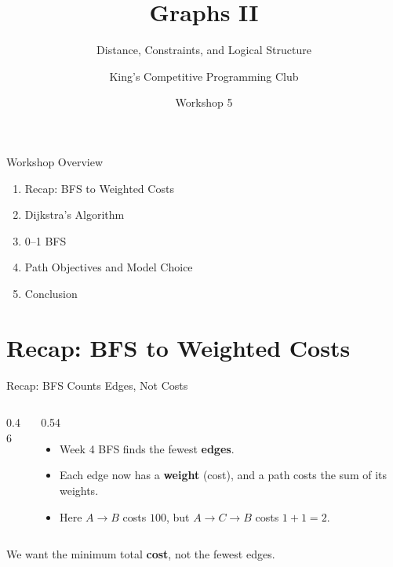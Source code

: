 \documentclass{beamer}
\title{Graphs II}
\subtitle{Distance, Constraints, and Logical Structure}
\author{King's Competitive Programming Club}
\date{Workshop 5}
\begin{document}
\begin{frame}[plain]\titlepage\end{frame}

\begin{frame}{Workshop Overview}
  \begin{enumerate}
    \item Recap: BFS to Weighted Costs
    \item Dijkstra's Algorithm
    \item 0--1 BFS
    \item Path Objectives and Model Choice
    \item Conclusion
  \end{enumerate}
\end{frame}

\section{Recap: BFS to Weighted Costs}

\begin{frame}{Recap: BFS Counts Edges, Not Costs}
  \begin{columns}[c]
    \begin{column}{0.46\textwidth}
      \centering
    \end{column}
    \begin{column}{0.54\textwidth}
      \begin{itemize}
        \item Week 4 BFS finds the fewest \textbf{edges}.
        \item Each edge now has a \textbf{weight} (cost), and a path costs the sum of its weights.
        \item Here $A\to B$ costs $100$, but $A\to C\to B$ costs $1+1=2$.
      \end{itemize}
    \end{column}
  \end{columns}
  \medskip
  We want the minimum total \textbf{cost}, not the fewest edges.
\end{frame}
\end{document}
